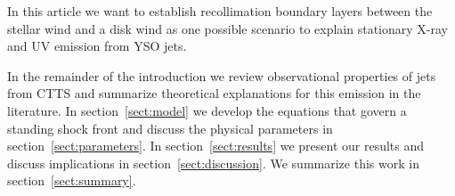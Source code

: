 In this article we want to establish recollimation boundary layers between the stellar wind and a disk wind as one possible scenario to explain stationary X-ray and UV emission from YSO jets.

In the remainder of the introduction we review observational properties of jets from CTTS and summarize theoretical explanations for this emission in the literature. In section~\ref{sect:model} we develop the equations that govern a standing shock front and discuss the physical parameters in section~\ref{sect:parameters}. In section~\ref{sect:results} we present our results and discuss implications in section~\ref{sect:discussion}. We summarize this work in section~\ref{sect:summary}.
